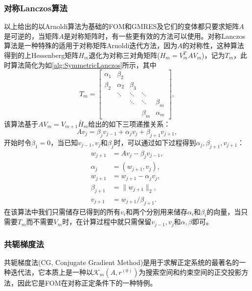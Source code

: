 \documentclass[a4paper,10pt]{ctexart}
\begin{document}
\subsubsection{对称Lanczos算法}
以上给出的以Arnoldi算法为基础的FOM和GMRES及它们的变体都只要求矩阵$ A $是可逆的，当矩阵$ A $是对称矩阵时，有一些更有效的方法可以使用。对称Lanczos算法是一种特殊的适用于对称矩阵Arnoldi迭代方法，因为$ A $的对称性，这种算法得到的上Hessenberg矩阵$ H_m $退化为对称三对角矩阵($ H_m = V^T_mAV_m $)，记为$ T_m $，此时算法简化为如\ref{alg:SymmetricLanczos}所示，其中
\[
    T_m = 
    \begin{bmatrix} 
        \alpha_1 & \beta_2 & & &\\
        \beta_2 & \alpha_2 & \beta_3 & &\\
        & \ddots & \ddots & \ddots &\\
        & & \ddots & \ddots & \beta_m\\
        & & & \beta_m & \alpha_m 
    \end{bmatrix},
\]
该算法基于$ AV_m = V_{m+1}\overline{H}_m $给出的如下三项递推关系：
\begin{equation}
    Av_j = \beta_jv_{j-1}+\alpha_jv_j+\beta_{j+1}v_{j+1},
\end{equation}
开始时令$ \beta_1=0 $，当已知$ v_{j-1},v_j $和$ \beta_j $时，可以通过如下过程得到$\alpha_j,\beta_{j+1}, v_{j+1} $：
\begin{equation}
    \begin{aligned}
        w_{j+1} &= Av_j - \beta_j v_{j-1},\\
        \alpha_j&= (w_{j+1},v_j),\\
        w_{j+1} &= w_{j+1} - \alpha_j v_j,\\
        \beta_{j+1} &= \| w_{j+1} \|_2,\\
        v_{j+1} &= w_{j+1} / \beta_{j+1}.
    \end{aligned}
\end{equation}
在该算法中我们只需储存已得到的所有$ v_i $和两个分别用来储存$ \alpha_i $和$ \beta_i $的向量，当只需要$ T_m $而不需要$ V_m $时，在计算过程中就只需保留$ v_{j-1},v_j $和$ \alpha,\beta $即可。

\subsubsection{共轭梯度法}
共轭梯度法(CG, Conjugate Gradient Method)是用于求解正定系统的最著名的一种迭代法，它本质上是一种以$ \mathcal{K}_m(A,r^{(0)}) $为搜索空间和约束空间的正交投影方法，因此它是FOM在对称正定条件下的一种特例。
\end{document}
